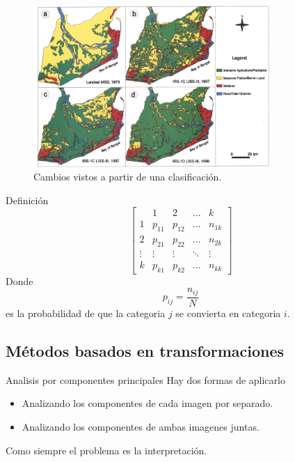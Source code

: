 \documentclass[handout,draft]{beamer}
\begin{document}
\begin{frame}{\subsecname}
  \begin{figure}
  \includegraphics[width=0.8\textwidth]{imagenes/mapa_d.png}
  \caption{Cambios vistos a partir de una clasificaci\'on.}
  \end{figure}
\end{frame}

\begin{frame}{\subsecname}
\begin{block}{Definici\'on}
\[
\begin{bmatrix}
      & 1               & 2           &  \dots     & k \\
    1 & p_{11}          & p_{12}      & \dots & n_{1k} \\
    2 & p_{21}          & p_{22}      & \dots & n_{2k}      \\
    \vdots  & \vdots & \vdots & \ddots      & \vdots   \\
    k & p_{k1}          & p_{k2} & \dots       & n_{kk}
\end{bmatrix} \]
\pause Donde $$p_{ij} = \frac{n_{ij}}{N}$$ es la probabilidad de que la categoria $j$ se convierta en categoria $i$.
\end{block}
\end{frame}

\subsection{M\'etodos basados en transformaciones}

\begin{frame}{\subsecname}
  \begin{block}{Analisis por componentes principales}
    Hay dos formas de aplicarlo
    \begin{itemize}
      \item Analizando los componentes de cada imagen por separado.
      \item Analizando los componentes de ambas imagenes juntas.
    \end{itemize}
    \pause Como siempre el problema es la interpretaci\'on.
  \end{block}
\end{frame}
\end{document}
